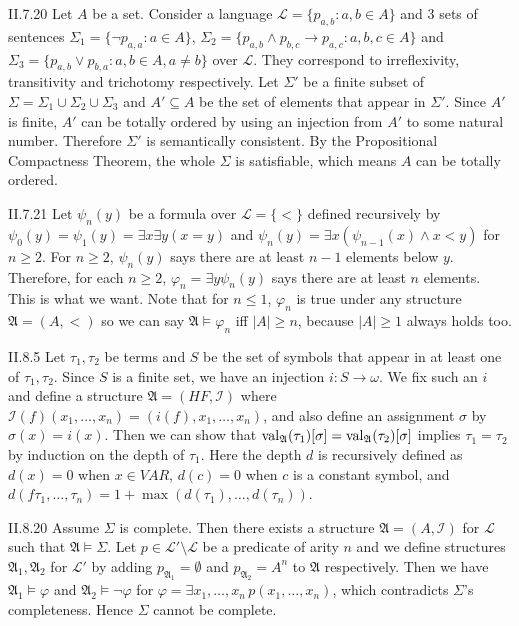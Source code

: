 \documentclass[12pt]{article}
\begin{document}
\begin{customthm}{II.7.20}
  Let $A$ be a set. Consider a language $\mathcal{L}=\{p_{a,b}:a,b\in A\}$ and 3 sets of sentences $\Sigma_1=\{\neg p_{a,a}:a\in A\}$, $\Sigma_2=\{p_{a,b}\wedge p_{b,c}\rightarrow p_{a,c}:a,b,c\in A\}$ and  $\Sigma_3=\{p_{a,b}\vee p_{b,a}:a,b\in A,a\neq b\}$ over $\mathcal{L}$. They correspond to irreflexivity, transitivity and trichotomy respectively. Let $\Sigma'$ be a finite subset of $\Sigma=\Sigma_1\cup\Sigma_2\cup\Sigma_3$ and $A'\subseteq A$ be the set of elements that appear in $\Sigma'$. Since $A'$ is finite, $A'$ can be totally ordered by using an injection from $A'$ to some natural number. Therefore $\Sigma'$ is semantically consistent. By the Propositional Compactness Theorem, the whole $\Sigma$ is satisfiable, which means $A$ can be totally ordered.
\end{customthm}

\begin{customthm}{II.7.21}
  Let $\psi_n(y)$ be a formula over $\mathcal{L}=\{<\}$ defined recursively by $\psi_0(y)=\psi_1(y)=\exists x\exists y(x=y)$ and $\psi_n(y)=\exists x(\psi_{n-1}(x)\wedge x<y)$ for $n\geq2$. For $n\geq2$, $\psi_n(y)$ says there are at least $n-1$ elements below $y$. Therefore, for each $n\geq2$, $\varphi_n=\exists y\psi_n(y)$ says there are at least $n$ elements. This is what we want. Note that for $n\leq1$, $\varphi_n$ is true under any structure $\mathfrak{A}=(A,<)$ so we can say $\mathfrak{A}\models\varphi_n$ iff $|A|\geq n$, because $|A|\geq 1$ always holds too.
\end{customthm}

\begin{customthm}{II.8.5}
  Let $\tau_1,\tau_2$ be terms and $S$ be the set of symbols that appear in at least one of $\tau_1,\tau_2$. Since $S$ is a finite set, we have an injection $i:S\rightarrow\omega$. We fix such an $i$ and define a structure $\mathfrak{A}=(HF,\mathcal{I})$ where $\mathcal{I}(f)(x_1,\ldots,x_n)=(i(f),x_1,\ldots,x_n)$, and also define an assignment $\sigma$ by $\sigma(x)=i(x)$. Then we can show that $\mathop{\mathrm{val}}_\mathfrak{A}(\tau_1)[\sigma]=\mathop{\mathrm{val}}_\mathfrak{A}(\tau_2)[\sigma]$ implies $\tau_1=\tau_2$ by induction on the depth of $\tau_1$. Here the depth $d$ is recursively defined as $d(x)=0$ when $x\in VAR$, $d(c)=0$ when $c$ is a constant symbol, and $d(f\tau_1,\ldots,\tau_n)=1+\max(d(\tau_1),\ldots,d(\tau_n))$.
\end{customthm}

\begin{customthm}{II.8.20}
  Assume $\Sigma$ is complete. Then there exists a structure $\mathfrak{A}=(A,\mathcal{I})$ for $\mathcal{L}$ such that $\mathfrak{A}\models\Sigma$. Let $p\in\mathcal{L}'\setminus\mathcal{L}$ be a predicate of arity $n$ and we define structures $\mathfrak{A}_1,\mathfrak{A}_2$ for $\mathcal{L}'$ by adding $p_{\mathfrak{A}_1}=\emptyset$ and $p_{\mathfrak{A}_2}=A^{n}$ to $\mathfrak{A}$ respectively. Then we have $\mathfrak{A}_1\models\varphi$ and $\mathfrak{A}_2\models\neg\varphi$ for $\varphi=\exists x_1,\ldots,x_n\,p(x_1,\ldots,x_n)$, which contradicts $\Sigma$'s completeness. Hence $\Sigma$ cannot be complete.
\end{customthm}
\end{document}
